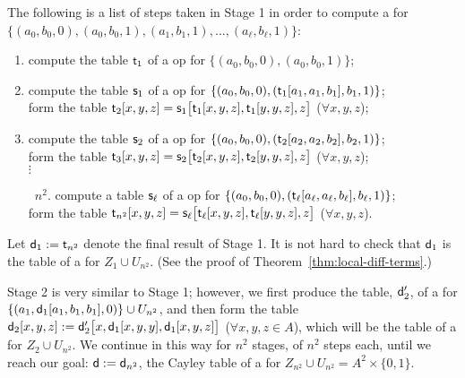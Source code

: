 \documentclass{ws-ijac}
\begin{document}
The following is a list of steps taken in Stage 1 in order to compute a \ldto for
$\{(a_0, b_0,0),(a_0, b_0,1),(a_1, b_1,1), \dots, (a_{\ell}, b_{\ell},1)\}$:
\begin{enumerate}[1.]
  \item compute the table $\mathsf{t}_1$ of a \ldt op for $\{(a_0, b_0, 0), (a_0, b_0, 1)\}$;\\[-8pt]
  \item compute the table $\mathsf{s}_1$ of a \ldt op for $\{(a_0, b_0, 0), (\mathsf{t}_1[a_1, a_1, b_1], b_1, 1)\}$; \\
  form the table $\mathsf{t}_2[x,y,z] = \mathsf{s}_1\bigl[\mathsf{t}_1[x,y,z], \mathsf{t}_1[y,y,z], z\bigr]$
  ($\forall x,y,z$);
  \\[-8pt]
  \item compute the table $\mathsf{s}_2$ of a \ldt op for $\{(a_0, b_0, 0), (\mathsf{t}_2[a_2, a_2, b_2], b_2, 1)\}$; \\
    form the table $\mathsf{t}_3[x,y,z] = \mathsf{s}_2\bigl[\mathsf{t}_2[x,y,z], \mathsf{t}_2[y,y,z], z\bigr]$  ($\forall x,y,z$);\\
  $\vdots$
  \item[~\hskip-5mm$n^2$\!.] compute a table $\mathsf{s}_{\ell}$ of a \ldt op for $\{(a_0, b_0, 0),  (\mathsf{t}_{\ell}[a_{\ell}, a_{\ell}, b_{\ell}], b_{\ell}, 1)\}$; \\
  form the table $\mathsf{t}_{n^2}[x,y,z] = \mathsf{s}_{\ell}\bigl[\mathsf{t}_{\ell}[x,y,z], \mathsf{t}_{\ell}[y,y,z], z\bigr]$
  ($\forall x,y,z$).
\end{enumerate}
Let $\mathsf{d}_1 := \mathsf{t}_{n^2}$ denote the final result of Stage 1. It is not hard to check that
$\mathsf{d}_1$ is the table of a \ldto for $Z_1 \cup U_{n^2}$. (See the proof of Theorem~\ref{thm:local-diff-terms}.)

Stage 2 is very similar to Stage 1; however, we first produce the table, $\mathsf{d}'_2$, of a \ldto for
$\{(a_1, \mathsf{d}_1[a_1, b_1, b_1], 0)\} \cup U_{n^2}$, and then form the table
$\mathsf{d}_2[x,y,z] := \mathsf{d}'_2\bigl[x, \mathsf{d}_1[x,y,y], \mathsf{d}_1[x,y,z]\bigr]$ ($\forall x,y,z \in A$),
which will be the table of a \ldto for $Z_2 \cup U_{n^2}$.
We continue in this way for $n^2$ stages, of $n^2$ steps each, until we reach
our goal: $\mathsf{d}:=\mathsf{d}_{n^2}$, the Cayley table of
a \ldto for $Z_{n^2} \cup U_{n^2} = A^2 \times \{0,1\}$.
\end{document}
